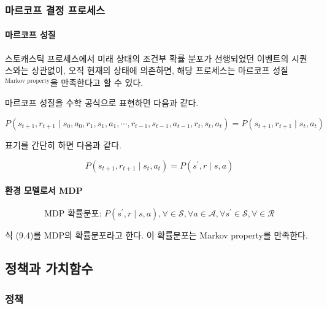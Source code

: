 \documentclass [12pt] {oblivoir}
\let\oldsubsubsection=\subsubsection
\renewcommand{\subsubsection}
{
  \filbreak
  \oldsubsubsection
}
\begin{document}
\subsubsection{마르코프 결정 프로세스}

\paragraph*{마르코프 성질}\mbox{}

스토캐스틱 프로세스에서 미래 상태의 조건부 확률 분포가 선행되었던 이벤트의 시퀀스와는 상관없이, 오직 현재의 상태에 의존하면, 해당 프로세스는 마르코프 성질$^{\text{Markov property}}$을 만족한다고 할 수 있다.

마르코프 성질을 수학 공식으로 표현하면 다음과 같다.

\begin{equation} \tag{9.2}
  P(s_{t+1}, r_{t+1} \mid s_{0}, a_{0}, r_{1}, s_{1}, a_{1}, \cdots, r_{t-1}, s_{t-1}, a_{t-1}, r_{t}, s_{t}, a_{t}) = P(s_{t+1}, r_{t+1} \mid s_{t}, a_{t})
\end{equation}

표기를 간단히 하면 다음과 같다.

\begin{equation} \tag{9.3}
  P(s_{t+1}, r_{t+1} \mid s_{t}, a_{t}) = P(s^{'}, r \mid s, a)
\end{equation}

\vspace{3mm}

\paragraph*{환경 모델로서 MDP}\mbox{}

\begin{equation} \tag{9.4}
  \text{MDP 확률분포: } P(s^{'},r \mid s, a), \forall \in \mathcal{S}, \forall a \in \mathcal{A}, \forall s^{'} \in \mathcal{S}, \forall \in \mathcal{R}
\end{equation}

식 (9.4)를 MDP의 확률분포라고 한다. 이 확률분포는 Markov property를 만족한다.

\vspace{3mm}

\subsection{정책과 가치함수}

\subsubsection{정책}
\end{document}
